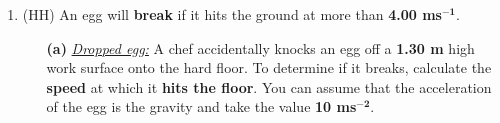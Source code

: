 \documentclass[A4,12pt]{article}
\begin{document}
\begin{enumerate}[label=\bfseries (\arabic*)]
\item (HH) An egg will \textbf{break} if it hits the ground at more than \textbf{4.00 ms}$\bm{^{-1}}$.
\begin{itemize}
    \item[\bf (a)] \href{https://isaacphysics.org/questions/cracking_eggs?board=1669d0ef-9884-4339-9d26-ec50e04fd189}{\it Dropped egg:} A chef accidentally knocks an egg off a \textbf{1.30 m} high work surface onto the hard floor. To determine if it breaks, calculate the \textbf{speed} at which it \textbf{hits the floor}. You can assume that the acceleration of the egg is the gravity and take the value \textbf{10 ms}$\bm{^{-2}}$.

\end{itemize}
\end{enumerate}
\end{document}
